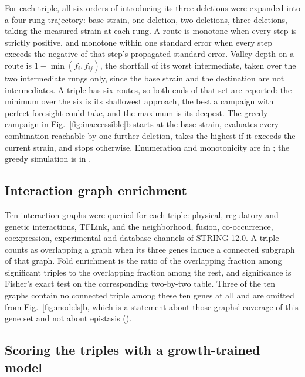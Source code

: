For each triple, all six orders of introducing its three deletions were expanded into a
four-rung trajectory: base strain, one deletion, two deletions, three deletions, taking the
measured strain at each rung. A route is monotone when every step is strictly positive, and
monotone within one standard error when every step exceeds the negative of that step's
propagated standard error. Valley depth on a route is $1 - \min(f_i, f_{ij})$, the
shortfall of its worst intermediate, taken over the two intermediate rungs only, since the
base strain and the destination are not intermediates. A triple has six routes, so both
ends of that set are reported: the minimum over the six is its shallowest approach, the
best a campaign with perfect foresight could take, and the maximum is its deepest. The greedy campaign in Fig.~\ref{fig:inaccessible}b starts at the base strain,
evaluates every combination reachable by one further deletion, takes the highest if it
exceeds the current strain, and stops otherwise. Enumeration and monotonicity are in
; the greedy simulation is in
.

\subsection*{Interaction graph enrichment}

Ten interaction graphs were queried for each triple: physical, regulatory and genetic
interactions, TFLink, and the neighborhood, fusion, co-occurrence, coexpression,
experimental and database channels of STRING 12.0. A triple counts as overlapping a graph
when its three genes induce a connected subgraph of that graph. Fold enrichment is the ratio
of the overlapping fraction among significant triples to the overlapping fraction among the
rest, and significance is Fisher's exact test on the corresponding two-by-two table. Three
of the ten graphs contain no connected triple among these ten genes at all and are omitted
from Fig.~\ref{fig:models}b, which is a statement about those graphs' coverage of this gene
set and not about epistasis
().

\subsection*{Scoring the triples with a growth-trained model}

